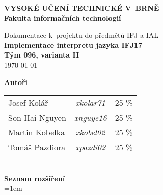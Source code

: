 \begin{titlepage}
    \centering

    {\fontsize{20pt}{15pt}\bfseries
    VYSOKÉ UČENÍ TECHNICKÉ V~BRNĚ\\
    \vspace{8pt}
    Fakulta informačních technologií
    }

    \vspace*{64pt}

    
    \vspace*{22pt}

    {\Large Dokumentace k~projektu do předmětů IFJ a IAL\\}
    \vspace*{4pt}
    {\LARGE \bfseries Implementace interpretu jazyka IFJ17\\}
    \vspace*{62pt}
    {\Large \bfseries Tým 096, varianta II\\}
    \vspace*{42pt}
    {\Large \today}

    \vspace*{64pt}
    {\Large \bfseries Autoři\\}
    \vspace*{8pt}
    \begin{tabular}{ l c r }
        Josef Kolář & \textit{xkolar71} & 25 \% \\
        Son Hai Nguyen & \textit{xnguye16} & 25 \% \\
        Martin Kobelka & \textit{xkobel02} & 25 \% \\
        Tomáš Pazdiora & \textit{xpazdi02} & 25 \% \\
    \end{tabular}\\
    \vspace*{32pt}
    {\Large \bfseries Seznam rozšíření\\}
    \vspace*{8pt}
    {\spaceskip=1em }\\ %
    \vspace*{32pt}

\end{titlepage}
